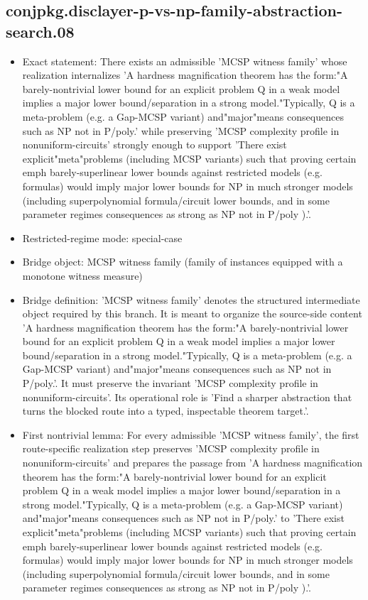 \documentclass[11pt]{article}
\begin{document}
\subsection*{conjpkg.disclayer-p-vs-np-family-abstraction-search.08}
\begin{itemize}
\item Exact statement: There exists an admissible 'MCSP witness family' whose realization internalizes 'A hardness magnification theorem has the form:"A barely-nontrivial lower bound for an explicit problem Q in a weak model implies a major lower bound/separation in a strong model."Typically, Q is a meta-problem (e.g. a Gap-MCSP variant) and"major"means consequences such as NP not in P/poly.' while preserving 'MCSP complexity profile in nonuniform-circuits' strongly enough to support 'There exist explicit"meta"problems (including MCSP variants) such that proving certain emph barely-superlinear lower bounds against restricted models (e.g. formulas) would imply major lower bounds for NP in much stronger models (including superpolynomial formula/circuit lower bounds, and in some parameter regimes consequences as strong as NP not in P/poly ).'.
\item Restricted-regime mode: special-case
\item Bridge object: MCSP witness family (family of instances equipped with a monotone witness measure)
\item Bridge definition: 'MCSP witness family' denotes the structured intermediate object required by this branch. It is meant to organize the source-side content 'A hardness magnification theorem has the form:"A barely-nontrivial lower bound for an explicit problem Q in a weak model implies a major lower bound/separation in a strong model."Typically, Q is a meta-problem (e.g. a Gap-MCSP variant) and"major"means consequences such as NP not in P/poly.'. It must preserve the invariant 'MCSP complexity profile in nonuniform-circuits'. Its operational role is 'Find a sharper abstraction that turns the blocked route into a typed, inspectable theorem target.'.
\item First nontrivial lemma: For every admissible 'MCSP witness family', the first route-specific realization step preserves 'MCSP complexity profile in nonuniform-circuits' and prepares the passage from 'A hardness magnification theorem has the form:"A barely-nontrivial lower bound for an explicit problem Q in a weak model implies a major lower bound/separation in a strong model."Typically, Q is a meta-problem (e.g. a Gap-MCSP variant) and"major"means consequences such as NP not in P/poly.' to 'There exist explicit"meta"problems (including MCSP variants) such that proving certain emph barely-superlinear lower bounds against restricted models (e.g. formulas) would imply major lower bounds for NP in much stronger models (including superpolynomial formula/circuit lower bounds, and in some parameter regimes consequences as strong as NP not in P/poly ).'.

\end{itemize}
\end{document}
